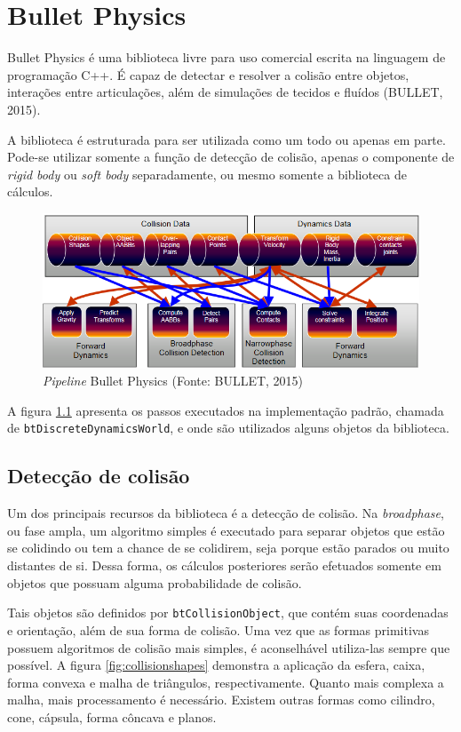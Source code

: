 \chapter{Bullet Physics}

Bullet Physics é uma biblioteca livre para uso comercial escrita na linguagem de programação C++. É capaz de detectar e resolver a colisão entre objetos, interações entre articulações, além de simulações de tecidos e fluídos (BULLET, 2015).

A biblioteca é estruturada para ser utilizada como um todo ou apenas em parte. Pode-se utilizar somente a função de detecção de colisão, apenas o componente de \textit{rigid body} ou \textit{soft body} separadamente, ou mesmo somente a biblioteca de cálculos.

\begin{figure}[H]
	\centering
	\includegraphics[scale=0.7]{imagens/bullet-pipeline.png}
	\caption[\textit{Pipeline} Bullet Physics]{\textit{Pipeline} Bullet Physics (Fonte: BULLET, 2015)}
	\label{fig:bulletpipeline}
\end{figure}

A figura \ref{fig:bulletpipeline} apresenta os passos executados na implementação padrão, chamada de \lstinline{btDiscreteDynamicsWorld}, e onde são utilizados alguns objetos da biblioteca.

\section{Detecção de colisão}

Um dos principais recursos da biblioteca é a detecção de colisão. Na \textit{broadphase}, ou fase ampla, um algoritmo simples é executado para separar objetos que estão se colidindo ou tem a chance de se colidirem, seja porque estão parados ou muito distantes de si. Dessa forma, os cálculos posteriores serão efetuados somente em objetos que possuam alguma probabilidade de colisão.

Tais objetos são definidos por \lstinline{btCollisionObject}, que contém suas coordenadas e orientação, além de sua forma de colisão. Uma vez que as formas primitivas possuem algoritmos de colisão mais simples, é aconselhável utiliza-las sempre que possível. A figura \ref{fig:collisionshapes} demonstra a aplicação da esfera, caixa, forma convexa e malha de triângulos, respectivamente. Quanto mais complexa a malha, mais processamento é necessário. Existem outras formas como cilindro, cone, cápsula, forma côncava e planos.

